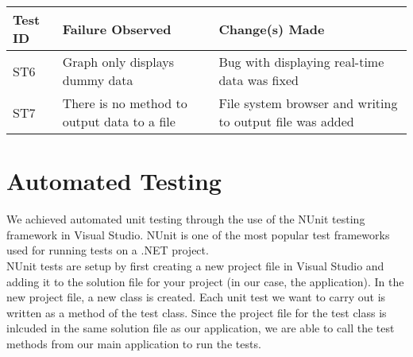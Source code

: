 \documentclass[12pt, titlepage]{article}
\begin{document}
\begin{tabular}{ |p{3cm}|p{5cm}|p{5cm}| }
  \hline
  \textbf{Test ID} & \textbf{Failure Observed} & \textbf{Change(s) Made} \\
  \hline 
  ST6 & Graph only displays dummy data & Bug with displaying real-time data was fixed \\ \hline
  ST7 & There is no method to output data to a file & File system browser and writing to output file was added \\
  \hline
 \end{tabular}


\section{Automated Testing}

\noindent We achieved automated unit testing through the use of the NUnit testing framework in Visual Studio. NUnit is one of the most popular test frameworks used for running tests on a .NET project.\\

\noindent NUnit tests are setup by first creating a new project file in Visual Studio and adding it to the solution file for your project (in our case, the application). In the new project file, a new class is created. Each unit test we want to carry out is written as a method of the test class. Since the project file for the test class is inlcuded in the same solution file as our application, we are able to call the test methods from our main application to run the tests.\\
		
\end{document}
